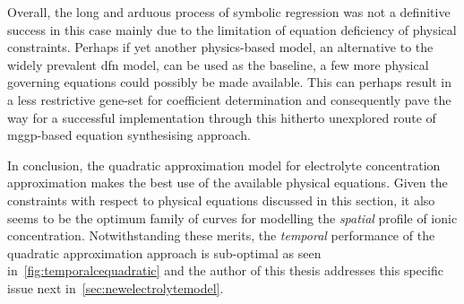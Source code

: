 Overall,  the  long  and  arduous  process of  symbolic  regression  was  not  a
definitive  success in  this  case  mainly due  to  the  limitation of  equation
deficiency of physical constraints. Perhaps  if yet another physics-based model,
\ie{} an  alternative to the  widely prevalent \gls{dfn}  model, can be  used as
the  baseline,  a  few  more  physical governing  equations  could  possibly  be
made  available. This  can perhaps  result in  a less  restrictive gene-set  for
coefficient  determination  and  consequently  pave the  way  for  a  successful
implementation  through  this  hitherto  unexplored  route  of  \gls{mggp}-based
equation synthesising approach.

In conclusion,  the quadratic approximation model  for electrolyte concentration
approximation makes the best use of  the available physical equations. Given the
constraints  with  respect to  physical  equations  discussed in  this  section,
it  also  seems   to  be  the  optimum  family  of   curves  for  modelling  the
\emph{spatial}  profile of  ionic concentration.  Notwithstanding these  merits,
the  \emph{temporal}  performance of  the  quadratic  approximation approach  is
sub-optimal  as seen  in~\cref{fig:temporalcequadratic} and  the author  of this
thesis addresses this specific issue next in~\cref{sec:newelectrolytemodel}.


